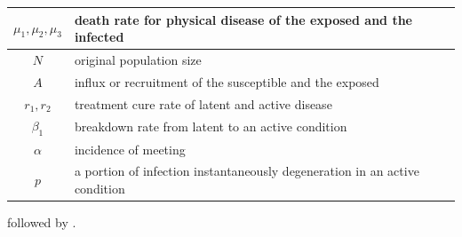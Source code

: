 \documentclass[11pt]{amsart}
\numberwithin{equation}{section}
\theoremstyle{plain}
\theoremstyle{definition}
\begin{document}
	\begin{center} \begin{tabular}{c|l}
	$\mu_1,\mu_2, \mu_3$      & death rate for physical disease of the exposed and the infected                                       \\ \hline
	$N$          & original population size                                              \\ \hline
	$A$          & influx or recruitment of the susceptible and the exposed              \\ \hline
	$r_1, r_2$ & treatment cure rate of latent and active disease                      \\ \hline
	$\beta_1$    & breakdown rate from latent to an active condition                        \\ \hline
	$\alpha$   & incidence of meeting                                                  \\ \hline
	$p$          & a portion of infection instantaneously degeneration in an active condition
	\end{tabular}\end{center}
	followed by \cite{MENG_2013}.
	
\end{document}

